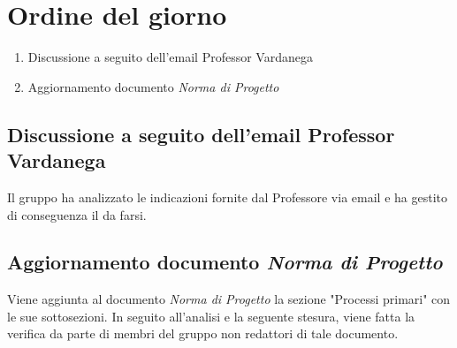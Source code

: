 \section{Ordine del giorno}
\begin{enumerate}
\item Discussione a seguito dell'email Professor Vardanega
\item Aggiornamento documento \textit{Norma di Progetto}
\end{enumerate}

\subsection{Discussione a seguito dell'email Professor Vardanega}
Il gruppo ha analizzato le indicazioni fornite dal Professore via email e ha gestito di conseguenza il da farsi. 
\subsection{Aggiornamento documento \textit{Norma di Progetto}}
Viene aggiunta al documento \textit{Norma di Progetto} la sezione "Processi primari" con le sue sottosezioni. In seguito all'analisi e la seguente stesura, viene fatta la verifica da parte di membri del gruppo non redattori di tale documento. 